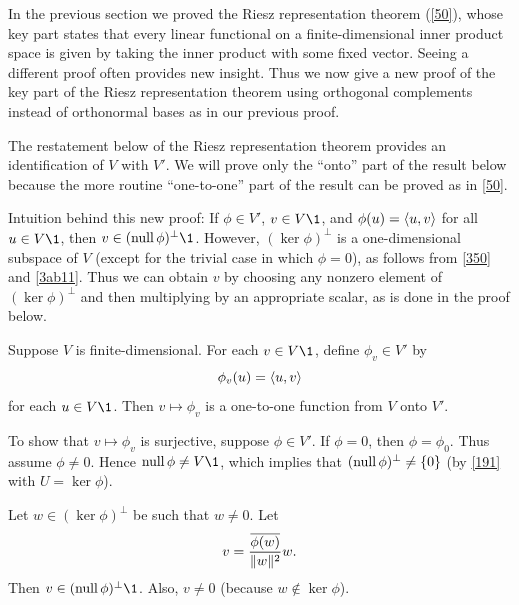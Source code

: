 In the previous section we proved the Riesz representation theorem (\ref{50}), whose key part states that every linear functional on a finite-dimensional inner product space is given by taking the inner product with some fixed vector. Seeing a different proof often provides new insight. Thus we now give a new proof of the key part of the Riesz representation theorem using orthogonal complements instead of orthonormal bases as in our previous proof.

The restatement below of the Riesz representation theorem provides an identification of $V$ with $V'\!$. We will prove only the ``onto'' part of the result below because the more routine ``one-to-one'' part of the result can be proved as in \ref{50}.

Intuition behind this new proof: If $\phi \in V'\!$, $v \in V\1$, and $\phi(u) = \langle u,v\rangle$ for all $u \in V\1$, then
$v \in (\ker \phi)^\perp\1$. However, $(\ker \phi)^\perp$ is a one-dimensional subspace of $V$ (except for the trivial case in which $\phi = 0$), as follows from \ref{350} and \ref{3ab11}. Thus we can obtain $v$ by choosing any nonzero element of $(\ker \phi)^\perp$ and then multiplying by an appropriate scalar, as is done in the proof below.

{Suppose $V$ is finite-dimensional. For each $v \in V\1$, define $\phi_v \in V'$ by
\[
\phi_v(u) = \langle u, v\rangle
\]
for each $u \in V\1$. Then $v \mapsto \phi_v$ is a one-to-one function from $V$ onto $V'\!$.}


\proof
To show that $v \mapsto \phi_v$ is surjective, suppose $\phi \in V'\!$.
If $\phi = 0$, then $\phi = \phi_0$. Thus assume $\phi \ne 0$. Hence $\ker \phi \ne V\1$, which implies that
$(\operatorname{null} \phi)^\perp \ne \{0\}$ (by \ref{191} with $U = \ker \phi$).

Let $w \in (\ker \phi)^\perp$ be such that $w \ne 0$. Let
\begin{equation} \label{wu}
v = \frac{ \overline{\phi(w)} }{\norm{w}^2} w.
\end{equation}%
Then $v \in (\ker \phi)^\perp\1$. Also, $v \ne 0$ (because $w \notin \ker \phi$).

\pagebreak[3]

